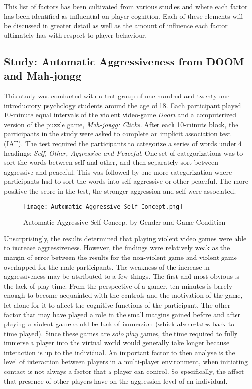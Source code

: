 \documentclass[12pt]{report}
\begin{document}
This list of factors has been cultivated from various studies and where each factor has been identified as influential on player cognition. Each of these elements will be discussed in greater detail as well as the amount of influence each factor ultimately has with respect to player behaviour.

\subsection{Study: Automatic Aggressiveness from DOOM and Mah-jongg\cite{Exposure_to_violence_in_videogames}}

This study was conducted with a test group of one hundred and twenty-one introductory psychology students around the age of 18. Each participant played 10-minute equal intervals of the violent video-game \textit{Doom} and a computerized version of the puzzle game, \textit{Mah-jongg: Clicks}. After each 10-minute block, the participants in the study were asked to complete an implicit association test (IAT). The test required the participants to categorize a series of words under 4 headings: \textit{Self, Other, Aggressive and Peaceful}. One set of categorizations was to sort the words between self and other, and then separately sort between aggressive and peaceful. This was followed by one more categorization where participants had to sort the words into self-aggressive or other-peaceful. The more positive the score in the test, the stronger aggression and self were associated.

\begin{figure}[h]
\begin{center}
\leavevmode
\texttt{[image: Automatic\_Aggressive\_Self\_Concept.png]}
\end{center}
\caption{Automatic Aggressive Self Concept by Gender and Game Condition \cite{Exposure_to_violence_in_videogames}}
\label{fig:exp_to_violence}
\end{figure}

Unsurprisingly, the results determined that playing violent video games were able to increase aggressiveness. However, the findings were relatively weak as the margin of error between the results for the non-violent game and violent game overlapped for the male participants. The weakness of the increase in aggressiveness may be attributed to a few things. The first and most obvious is the lack of play time. From the perspective of a gamer, ten minutes is barely enough to become acquainted with the controls and the motivation of the game, let alone for it to affect the cognitive functions of the participant. The other factor that may have played a role in the small margins gained before and after playing a violent game could be lack of immersion (which also relates back to time played). Since these games are \textit{solo play} games, the time required to fully immerse a player into the virtual world would generally take longer because interaction is up to the individual. An important factor to then analyse is the level of interaction between players in a multi-player environment, when initiating contact is not always a factor that a player can control. So specifically, the affect that presence of other players have on the aggression level of an individual.
\end{document}

